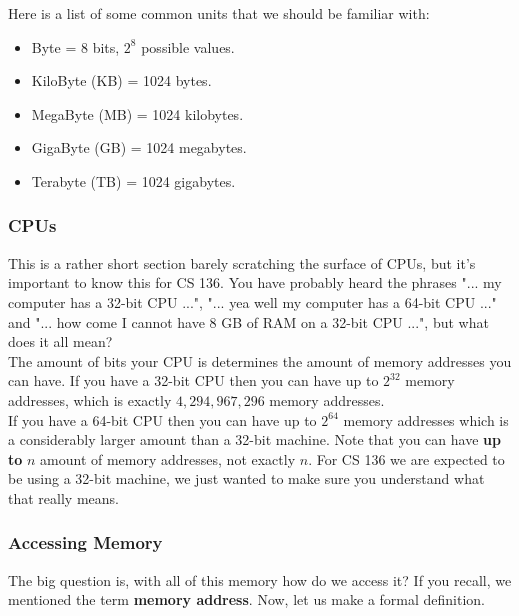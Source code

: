 Here is a list of some common units that we should be familiar with:

\begin{itemize}

\item Byte = 8 bits, $2^{8}$ possible values.
\item KiloByte (KB) = 1024 bytes.
\item MegaByte (MB) = 1024 kilobytes.
\item GigaByte (GB) = 1024 megabytes.
\item Terabyte (TB) = 1024 gigabytes.

\end{itemize}

\subsubsection*{CPUs}

This is a rather short section barely scratching the surface of CPUs, but it's important to know this for CS 136. You have probably heard the phrases "... my computer has a 32-bit CPU ...", "... yea well my computer has a 64-bit CPU ..." and "... how come I cannot have 8 GB of RAM on a 32-bit CPU ...", but what does it all mean?\\

The amount of bits your CPU is determines the amount of memory addresses you can have. If you have a 32-bit CPU then you can have up to $2^{32}$ memory addresses, which is exactly $4,294,967,296$ memory addresses.\\

If you have a 64-bit CPU then you can have up to $2^{64}$ memory addresses which is a considerably larger amount than a 32-bit machine. Note that you can have \textbf{up to} $n$ amount of memory addresses, not exactly $n$. For CS 136 we are expected to be using a 32-bit machine, we just wanted to make sure you understand what that really means.

\subsubsection*{Accessing Memory}

The big question is, with all of this memory how do we access it? If you recall, we mentioned the term \textbf{memory address}. Now, let us make a formal definition.\\


